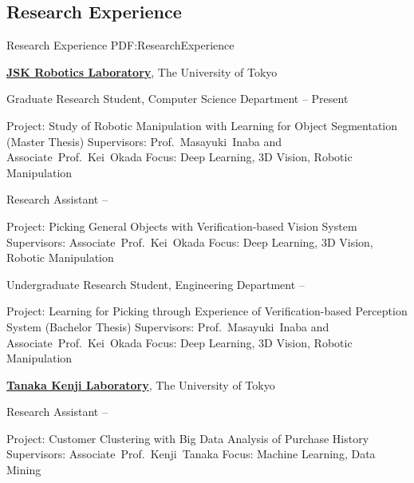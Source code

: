 \documentclass[letterpaper,MMMyyyy,nonstop]{simpleresumecv}
\begin{document}
\begin{body}

\section
{Research Experience}
{Research Experience}
{PDF:ResearchExperience}

\href{http://www.jsk.t.u-tokyo.ac.jp/}
{\textbf{JSK Robotics Laboratory}},
The University of Tokyo

\GapNoBreak
\BulletItem
Graduate Research Student, Computer Science Department
\hfill
{} --
Present
\begin{detail}
\SubBulletItem
Project:
Study of Robotic Manipulation with Learning for Object Segmentation (Master Thesis)
\SubBulletItem
Supervisors:
Prof.~Masayuki~Inaba and Associate~Prof.~Kei~Okada
\SubBulletItem
Focus:
Deep Learning, 3D Vision, Robotic Manipulation
\end{detail}

\GapNoBreak
\BulletItem
Research Assistant
\hfill
{} --
\begin{detail}
\SubBulletItem
Project:
Picking General Objects with Verification-based Vision System
\SubBulletItem
Supervisors:
Associate~Prof.~Kei~Okada
\SubBulletItem
Focus:
Deep Learning, 3D Vision, Robotic Manipulation
\end{detail}

\GapNoBreak
\BulletItem
Undergraduate Research Student, Engineering Department
\hfill
{} --
\begin{detail}
\SubBulletItem
Project:
Learning for Picking through Experience of Verification-based Perception System (Bachelor Thesis)
\SubBulletItem
Supervisors:
Prof.~Masayuki~Inaba and Associate~Prof.~Kei~Okada
\SubBulletItem
Focus:
Deep Learning, 3D Vision, Robotic Manipulation
\end{detail}


\href{http://www.jsk.t.u-tokyo.ac.jp/}
{\textbf{Tanaka Kenji Laboratory}},
The University of Tokyo

\GapNoBreak
\BulletItem
Research Assistant
\hfill
{} --
\begin{detail}
\SubBulletItem
Project:
Customer Clustering with Big Data Analysis of Purchase History
\SubBulletItem
Supervisors:
Associate~Prof.~Kenji~Tanaka
\SubBulletItem
Focus:
Machine Learning, Data Mining
\end{detail}


\end{body}
\end{document}
